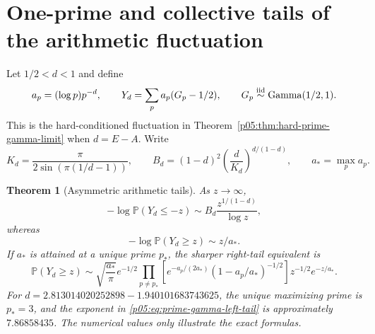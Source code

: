 \documentclass[11pt,letterpaper]{article}
\newtheorem{theorem}{Theorem}[section]
\theoremstyle{definition}
\theoremstyle{remark}
\newcommand{\1}{\mathbf 1}
\begin{document}
\section{One-prime and collective tails of the arithmetic fluctuation}
\label{p05:sec:prime-fluctuation-tails}

Let $1/2<d<1$ and define
\[
 a_p=(\log p)p^{-d},\qquad
 Y_d=\sum_pa_p(G_p-1/2),\qquad
 G_p\overset{\rm iid}{\sim}\operatorname{Gamma}(1/2,1).
\]
This is the hard-conditioned fluctuation in
Theorem~\ref{p05:thm:hard-prime-gamma-limit} when $d=E-A$.
Write
\[
 K_d=\frac{\pi}{2\sin(\pi(1/d-1))},\qquad
 B_d=(1-d)^2\left(\frac d{K_d}\right)^{d/(1-d)},
 \qquad a_* =\max_p a_p.
\]

\begin{theorem}[Asymmetric arithmetic tails]
\label{p05:thm:arithmetic-fluctuation-tails}
As $z\to\infty$,
\begin{equation}\label{p05:eq:prime-gamma-left-tail}
 -\log\mathbb P(Y_d\le-z)
 \sim B_d\frac{z^{1/(1-d)}}{\log z},
\end{equation}
whereas
\begin{equation}\label{p05:eq:prime-gamma-right-tail}
 -\log\mathbb P(Y_d\ge z)\sim z/a_*.
\end{equation}
If $a_*$ is attained at a unique prime $p_*$, the sharper right-tail
equivalent is
\[
 \mathbb P(Y_d\ge z)
 \sim\sqrt{\frac{a_*}{\pi}}e^{-1/2}
 \prod_{p\ne p_*}
 \left[e^{-a_p/(2a_*)}(1-a_p/a_*)^{-1/2}\right]
 z^{-1/2}e^{-z/a_*}.
\]
For $d=2.813014020252898-1.940101683743625$, the unique maximizing
prime is $p_*=3$, and the exponent in
\eqref{p05:eq:prime-gamma-left-tail} is approximately $7.86858435$.
The numerical values only illustrate the exact formulas.
\end{theorem}
\end{document}
